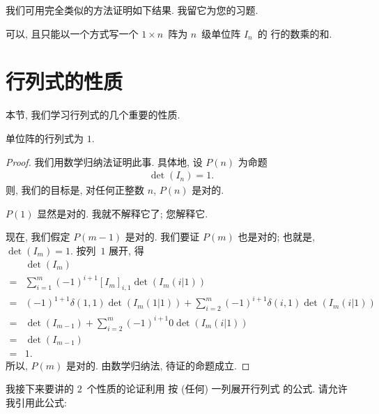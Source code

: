 \documentclass[../libro.tex]{subfiles}
\begin{document}
我们可用完全类似的方法证明如下结果.
我留它为您的习题.

\begin{theorem}
    可以, 且只能以一个方式写一个
    \(1 \times n\)~阵为 \(n\)~级单位阵 \(I_n\)~的%
    行的数乘的和.
\end{theorem}

\section{行列式的性质}

本节, 我们学习行列式的几个重要的性质.

\begin{theorem}[规范性]
    单位阵的行列式为 \(1\).
\end{theorem}

\begin{proof}
    我们用数学归纳法证明此事.
    具体地, 设 \(P(n)\) 为命题
    \begin{align*}
        \det {(I_n)} = 1.
    \end{align*}
    则, 我们的目标是,
    对任何正整数 \(n\), \(P(n)\) 是对的.

    \(P(1)\) 显然是对的.
    我就不解释它了; 您解释它.

    现在, 我们假定 \(P(m-1)\) 是对的.
    我们要证 \(P(m)\) 也是对的;
    也就是, \(\det {(I_m)} = 1\).
    按列~\(1\) 展开, 得
    \begin{align*}
        & \det {(I_m)}
        \\
        = {} & \sum_{i = 1}^{m}
        {(-1)^{i+1} [I_m]_{i,1} \det {(I_m (i|1))}}
        \\
        = {} & (-1)^{1+1} \delta(1, 1) \det {(I_m (1|1))}
        + \sum_{i = 2}^{m}
        {(-1)^{i+1} \delta(i, 1) \det {(I_m (i|1))}}
        \\
        = {} & \det {(I_{m-1})}
        + \sum_{i = 2}^{m} {(-1)^{i+1} 0 \det {(I_m (i|1))}}
        \\
        = {} & \det {(I_{m-1})}
        \\
        = {} & 1.
    \end{align*}
    所以, \(P(m)\) 是对的.
    由数学归纳法, 待证的命题成立.
\end{proof}

我接下来要讲的 \(2\)~个性质的论证利用%
按 (任何) 一列展开行列式%
的公式.
请允许我引用此公式:
\end{document}
